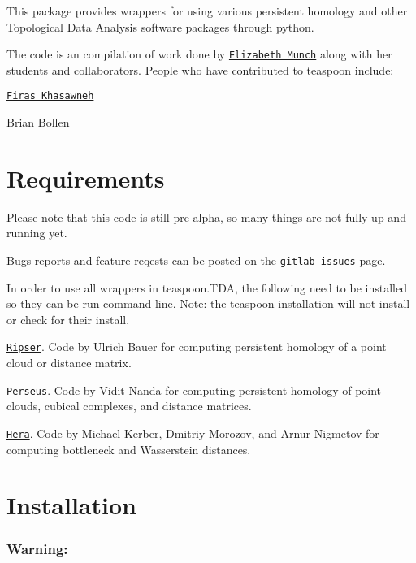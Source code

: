 This package provides wrappers for using various persistent homology and other Topological Data Analysis software packages through python.

The code is an compilation of work done by \href{http://www.elizabethmunch.com/math}{\tt Elizabeth Munch} along with her students and collaborators. People who have contributed to teaspoon include\+:


\begin{DoxyItemize}
\item \href{http://www.firaskhasawneh.com}{\tt Firas Khasawneh}
\item Brian Bollen
\end{DoxyItemize}

\section*{Requirements }

Please note that this code is still pre-\/alpha, so many things are not fully up and running yet.

Bugs reports and feature reqests can be posted on the \href{https://gitlab.msu.edu/TSAwithTDA/teaspoon/issues}{\tt gitlab issues} page.

In order to use all wrappers in teaspoon.\+T\+DA, the following need to be installed so they can be run command line. Note\+: the teaspoon installation will not install or check for their install.


\begin{DoxyItemize}
\item \href{https://github.com/Ripser/ripser}{\tt Ripser}. Code by Ulrich Bauer for computing persistent homology of a point cloud or distance matrix.
\item \href{http://people.maths.ox.ac.uk/nanda/perseus/index.html}{\tt Perseus}. Code by Vidit Nanda for computing persistent homology of point clouds, cubical complexes, and distance matrices.
\item \href{https://bitbucket.org/grey_narn/hera}{\tt Hera}. Code by Michael Kerber, Dmitriy Morozov, and Arnur Nigmetov for computing bottleneck and Wasserstein distances.
\end{DoxyItemize}

\section*{Installation }

\subsubsection*{Warning\+:}


